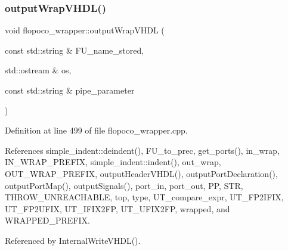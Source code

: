 \subsubsection{\texorpdfstring{output\+Wrap\+V\+H\+D\+L()}{outputWrapVHDL()}}
{\footnotesize\ttfamily void flopoco\+\_\+wrapper\+::output\+Wrap\+V\+H\+DL (\begin{DoxyParamCaption}\item[{const std\+::string \&}]{F\+U\+\_\+name\+\_\+stored,  }\item[{std\+::ostream \&}]{os,  }\item[{const std\+::string \&}]{pipe\+\_\+parameter }\end{DoxyParamCaption})\hspace{0.3cm}{\ttfamily [private]}}



Definition at line 499 of file flopoco\+\_\+wrapper.\+cpp.



References simple\+\_\+indent\+::deindent(), F\+U\+\_\+to\+\_\+prec, get\+\_\+ports(), in\+\_\+wrap, I\+N\+\_\+\+W\+R\+A\+P\+\_\+\+P\+R\+E\+F\+IX, simple\+\_\+indent\+::indent(), out\+\_\+wrap, O\+U\+T\+\_\+\+W\+R\+A\+P\+\_\+\+P\+R\+E\+F\+IX, output\+Header\+V\+H\+D\+L(), output\+Port\+Declaration(), output\+Port\+Map(), output\+Signals(), port\+\_\+in, port\+\_\+out, PP, S\+TR, T\+H\+R\+O\+W\+\_\+\+U\+N\+R\+E\+A\+C\+H\+A\+B\+LE, top, type, U\+T\+\_\+compare\+\_\+expr, U\+T\+\_\+\+F\+P2\+I\+F\+IX, U\+T\+\_\+\+F\+P2\+U\+F\+IX, U\+T\+\_\+\+I\+F\+I\+X2\+FP, U\+T\+\_\+\+U\+F\+I\+X2\+FP, wrapped, and W\+R\+A\+P\+P\+E\+D\+\_\+\+P\+R\+E\+F\+IX.



Referenced by Internal\+Write\+V\+H\+D\+L().

